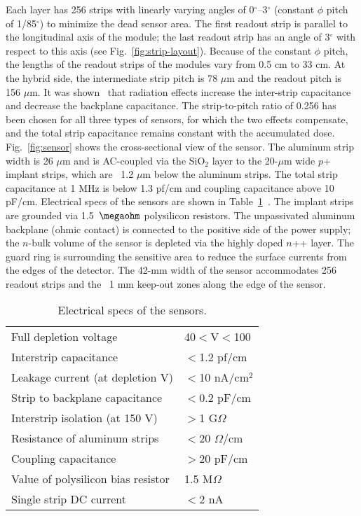 Each layer has 256 strips with linearly varying angles of 0$^\circ$--3$^\circ$ (constant $\phi$ pitch of 1/85$^\circ$) to minimize the dead sensor area. The first readout strip is parallel to the longitudinal axis of the module; the last readout strip has an angle of 3$^\circ$ with respect to this axis (see Fig.~\ref{fig:strip-layout}). Because of the constant $\phi$ pitch, the lengths of the readout strips of the modules vary from 0.5 cm to 33 cm. At the hybrid side, the intermediate strip pitch is 78 $\mu$m and the readout pitch is 156 $\mu$m. It was shown~\cite{BRAIBANTNOTE} that radiation effects increase the inter-strip capacitance and decrease the backplane capacitance. The strip-to-pitch ratio of 0.256 has been chosen for all three types of sensors, for which the two effects compensate, and the total strip capacitance remains constant with the accumulated dose. Fig.~\ref{fig:sensor} shows the cross-sectional view of the sensor. The aluminum strip width is 26 $\mu$m and is AC-coupled via the SiO$_2$ layer to the 20-$\mu$m wide $p$+ implant strips, which are ~1.2 $\mu$m below the aluminum strips. The total strip capacitance at 1 MHz is below 1.3 pf/cm and coupling capacitance above 10 pF/cm. Electrical specs of the sensors are shown in Table~\ref{tab:sensor-table}~\cite{SENSORNOTE}. The implant strips are grounded via 1.5~$\megaohm$ polysilicon resistors. The unpassivated aluminum backplane (ohmic contact) is connected to the positive side of the power supply; the $n$-bulk volume of the sensor is depleted via the highly doped $n$++ layer. The guard ring is surrounding the sensitive area to reduce the surface currents from the edges of the detector. The 42-mm width of the sensor accommodates 256 readout strips and the ~1 mm keep-out zones along the edge of the sensor.

\begin{table}[hbt]
\begin{tabular}{ll}
\hline
Full depletion voltage      & 40$<$V$<$100 \\ 
Interstrip capacitance      & $<$1.2 pf/cm                       \\
Leakage current (at depletion V)        & $<$10 nA/cm$^2$                       \\
Strip to backplane capacitance        & $<$0.2 pF/cm                       \\
Interstrip isolation (at 150 V)           & $>$1 G$\Omega$                       \\ 
Resistance of aluminum strips        & $<$20 $\Omega$/cm                       \\
Coupling capacitance        & $>$20 pF/cm                       \\
Value of polysilicon bias resistor   & 1.5 M$\Omega$     \\
Single strip DC current & $<$2 nA\\ \hline
\end{tabular}
\caption{Electrical specs of the sensors.}
\label{tab:sensor-table}
\end{table}

